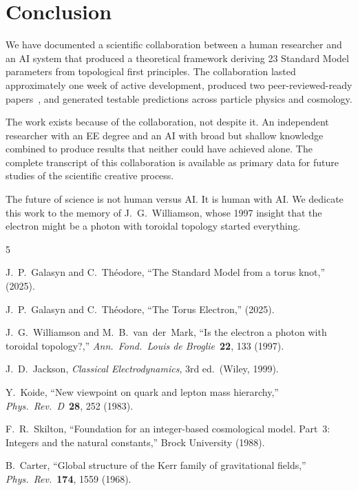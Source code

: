 \documentclass[11pt,a4paper]{article}
\begin{document}
\section{Conclusion}
\label{sec:conclusion}

We have documented a scientific collaboration between a human researcher and an AI system that produced a theoretical framework deriving 23 Standard Model parameters from topological first principles. The collaboration lasted approximately one week of active development, produced two peer-reviewed-ready papers~\cite{paper1,paper2}, and generated testable predictions across particle physics and cosmology.

The work exists because of the collaboration, not despite it. An independent researcher with an EE degree and an AI with broad but shallow knowledge combined to produce results that neither could have achieved alone. The complete transcript of this collaboration is available as primary data for future studies of the scientific creative process.

The future of science is not human versus AI. It is human with AI. We dedicate this work to the memory of J.~G.~Williamson, whose 1997 insight that the electron might be a photon with toroidal topology started everything.

\begin{thebibliography}{5}

J.~P.~Galasyn and C.~Th\'eodore,
``The Standard Model from a torus knot,'' (2025).

J.~P.~Galasyn and C.~Th\'eodore,
``The Torus Electron,'' (2025).

J.~G.~Williamson and M.~B.~van~der~Mark,
``Is the electron a photon with toroidal topology?,''
\emph{Ann.\ Fond.\ Louis de Broglie}\ \textbf{22}, 133 (1997).

J.~D.~Jackson,
\emph{Classical Electrodynamics}, 3rd ed.\ (Wiley, 1999).

Y.~Koide,
``New viewpoint on quark and lepton mass hierarchy,''
\emph{Phys.\ Rev.\ D}\ \textbf{28}, 252 (1983).

F.~R.~Skilton,
``Foundation for an integer-based cosmological model.
Part~3: Integers and the natural constants,''
Brock University (1988).

B.~Carter,
``Global structure of the Kerr family of gravitational fields,''
\emph{Phys.\ Rev.}\ \textbf{174}, 1559 (1968).

\end{thebibliography}
\end{document}
